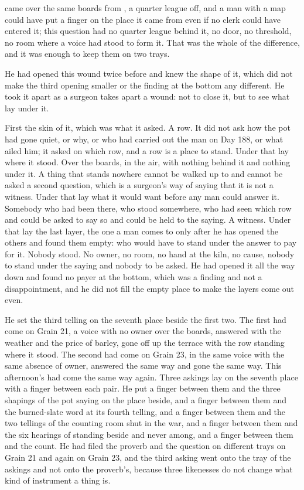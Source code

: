  came over the same boards from , a quarter league off, and a man with a map could have put a finger on the place it came from even if no clerk could have entered it; this question had no quarter league behind it, no door, no threshold, no room where a voice had stood to form it. That was the whole of the difference, and it was enough to keep them on two trays.

He had opened this wound twice before and knew the shape of it, which did not make the third opening smaller or the finding at the bottom any different. He took it apart as a surgeon takes apart a wound: not to close it, but to see what lay under it.

First the skin of it, which was what it asked. A row. It did not ask how the pot had gone quiet, or why, or who had carried out the man on Day 188, or what ailed him; it asked on which row, and a row is a place to stand. Under that lay where it stood. Over the boards, in the air, with nothing behind it and nothing under it. A thing that stands nowhere cannot be walked up to and cannot be asked a second question, which is a surgeon's way of saying that it is not a witness. Under that lay what it would want before any man could answer it. Somebody who had been there, who stood somewhere, who had seen which row and could be asked to say so and could be held to the saying. A witness. Under that lay the last layer, the one a man comes to only after he has opened the others and found them empty: who would have to stand under the answer to pay for it. Nobody stood. No owner, no room, no hand at the kiln, no cause, nobody to stand under the saying and nobody to be asked. He had opened it all the way down and found no payer at the bottom, which was a finding and not a disappointment, and he did not fill the empty place to make the layers come out even.

He set the third telling on the seventh place beside the first two. The first had come on Grain 21, a voice with no owner over the boards, answered with the weather and the price of barley, gone off up the terrace with the row standing where it stood. The second had come on Grain 23, in the same voice with the same absence of owner, answered the same way and gone the same way. This afternoon's had come the same way again. Three askings lay on the seventh place with a finger between each pair. He put a finger between them and the three shapings of the pot saying on the place beside, and a finger between them and the burned-slate word at its fourth telling, and a finger between them and the two tellings of the counting room shut in the war, and a finger between them and the six hearings of  standing beside and never among, and a finger between them and the count. He had filed the proverb and the question on different trays on Grain 21 and again on Grain 23, and the third asking went onto the tray of the askings and not onto the proverb's, because three likenesses do not change what kind of instrument a thing is.

